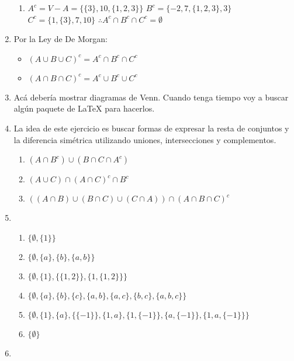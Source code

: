 \begin{enumerate}
\begin{enumerate}
  \item $A^c = V - A = \{\{3\},10,\{1,2,3\}\}$\newline
  $B^c = \{-2,7,\{1,2,3\},3\}$\newline
  $C^c = \{1,\{3\},7,10\}$\newline
  $\therefore A^c \cap B^c \cap C^c = \emptyset$
  \end{enumerate}
\item %
  Por la Ley de De Morgan:
  \begin{multicols}{2}
  \begin{itemize}
  \item $(A \cup B \cup C)^c = A^c \cap B^c \cap C^c$
  \item $(A \cap B \cap C)^c = A^c \cup B^c \cup C^c$
  \end{itemize}
  \end{multicols}
\item %
  Acá debería mostrar diagramas de Venn. Cuando tenga tiempo voy a buscar algún paquete de LaTeX para hacerlos.
\item %
  La idea de este ejercicio es buscar formas de expresar la resta de conjuntos y la diferencia simétrica utilizando uniones, intersecciones y complementos.
  \begin{multicols}{2}
  \begin{enumerate}
  \item $(A \cap B^c) \cup (B \cap C \cap A^c)$
  \item $(A \cup C) \cap (A \cap C)^c \cap B^c$
  \item $((A \cap B) \cup (B \cap C) \cup (C \cap A)) \cap (A \cap B \cap C)^c$
  \end{enumerate}
  \end{multicols}
\item %
  \begin{enumerate}
  \item $\{\emptyset,\{1\}\}$
  \item $\{\emptyset,\{a\},\{b\},\{a,b\}\}$
  \item $\{\emptyset,\{1\},\{\{1,2\}\},\{1,\{1,2\}\}\}$
  \item $\{\emptyset,\{a\},\{b\},\{c\},\{a,b\},\{a,c\},\{b,c\},\{a,b,c\}\}$
  \item $\{\emptyset,\{1\},\{a\},\{\{-1\}\},\{1,a\},\{1,\{-1\}\},\{a,\{-1\}\},\{1,a,\{-1\}\}\}$
  \item $\{\emptyset\}$
  \end{enumerate}
\item %

\end{enumerate}

